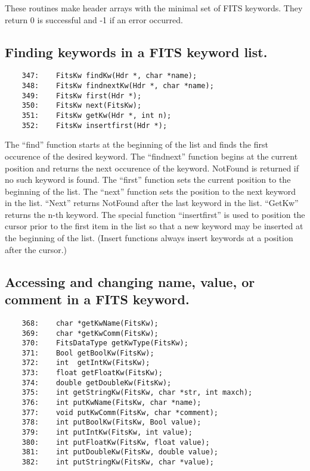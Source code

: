 These routines make header arrays with the minimal set of FITS keywords.
They return 0 is successful and -1 if an error occurred.

\subsection{ Finding keywords in a FITS keyword list.}

\begin{scriptsize}
\begin{verbatim}
    347:    FitsKw findKw(Hdr *, char *name);
    348:    FitsKw findnextKw(Hdr *, char *name);
    349:    FitsKw first(Hdr *);
    350:    FitsKw next(FitsKw);
    351:    FitsKw getKw(Hdr *, int n);
    352:    FitsKw insertfirst(Hdr *);
\end{verbatim}
\end{scriptsize}

The ``find'' function starts at the beginning of the list and finds the 
first occurence of the desired keyword.  The ``findnext'' function  
begins at the current position and returns the next occurence of the 
keyword.  NotFound is returned if no such keyword is found.  The ``first'' 
function sets the current position to the beginning of the list.
The ``next'' function sets the position to the next keyword in the list.
``Next'' returns NotFound after the last keyword in the list.  ``GetKw''
returns the n-th keyword.  The special function ``insertfirst'' is used to
position the cursor prior to the first item in the list so that a new
keyword may be inserted at the beginning of the list.  (Insert functions
always insert keywords at a position after the cursor.)

\subsection{ Accessing and changing name, value, or comment in a FITS keyword.}

\begin{scriptsize}
\begin{verbatim}
    368:    char *getKwName(FitsKw);
    369:    char *getKwComm(FitsKw);
    370:    FitsDataType getKwType(FitsKw);
    371:    Bool getBoolKw(FitsKw);
    372:    int  getIntKw(FitsKw);
    373:    float getFloatKw(FitsKw);
    374:    double getDoubleKw(FitsKw);
    375:    int getStringKw(FitsKw, char *str, int maxch);
    376:    int putKwName(FitsKw, char *name);
    377:    void putKwComm(FitsKw, char *comment);
    378:    int putBoolKw(FitsKw, Bool value);
    379:    int putIntKw(FitsKw, int value);
    380:    int putFloatKw(FitsKw, float value);
    381:    int putDoubleKw(FitsKw, double value);
    382:    int putStringKw(FitsKw, char *value);
\end{verbatim}
\end{scriptsize}

